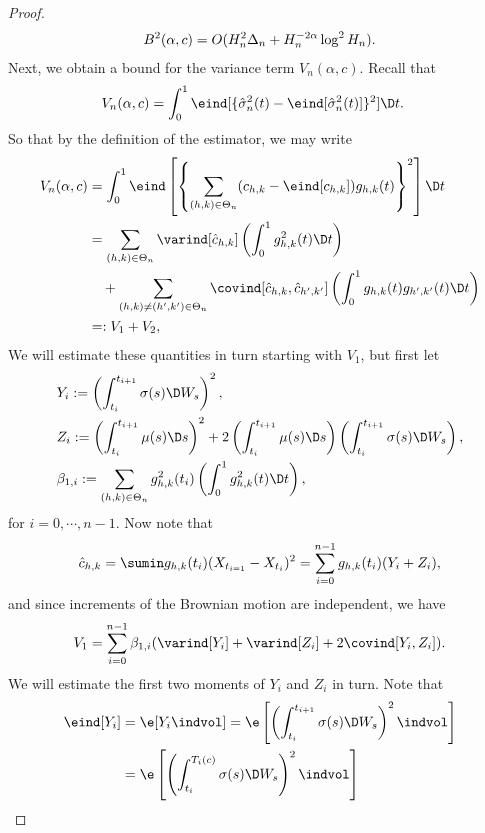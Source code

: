 \begin{appendices}
\begin{proof}
\begin{align}
  B^2(\alpha,c) =  O(H_n^2 \Delta_n  + H_n^{-2\alpha}\log^2 H_n).\notag
  \label{}
\end{align}
Next, we obtain a  bound for the variance term $V_n(\alpha, c)$. Recall that
\begin{align}
V_n(\alpha,c)  & =  \int_0^1 \eind[\{\svn(t) - \eind[\svn(t)]\}^2]  \D t.
\notag
\end{align}
So that by the definition of the estimator, we may write
\begin{align}
 V_n(\alpha,c) & =   \int_0^1\eind\left[\left\{\sumt (\chk -\eind[\chk])\ghk(t)\right\}^2 \right]\D t \notag\\
& =\sum_{(h,k) \in \Theta_n}\varind[\cnhk]\left( \int_0^1 g_{h,k}^2(t) \D t\right)\notag \\
& \quad + \sum_{(h,k) \ne (h',k') \in \Theta_n} \covind[\cnhk, \hat{c}_{h',k'}]\left( \int_0^1 g_{h,k}(t) g_{h',k'}(t)\D t\right) \notag\\
& =: V_1 + V_2,
\end{align}
 We will estimate these quantities in turn starting with $V_1$, but first let  
\begin{align}
  &Y_i := \left(\int^{t_{i+1}}_{t_i} \sigma(s) \D W_s\right)^2 ,\notag\\
  &Z_i := \left(\int^{t_{i+1}}_{t_i} \mu(s) \D s\right)^2 + 2\left(\int^{t_{i+1}}_{t_i} \mu(s) \D s\right)\left(\int^{t_{i+1}}_{t_i} \sigma(s) \D W_s\right), \notag\\ 
  &\beta_{1,i} := \sum_{(h,k) \in \Theta_n} g^2_{h,k}(t_i)\left( \int_0^1 g_{h,k}^2(t) \D t\right),\notag
  \label{}
\end{align}
for $i = 0,\cdots, n-1$. Now note that 
\begin{align}
  \cnhk = \sumin \ghk(t_i) (X_{t_{i=1}} - X_{t_i})^2 = \sum_{i = 0}^{n-1} g_{h,k}(t_i) (Y_i + Z_i),\notag
  \label{}
\end{align}
and  since  increments of the Brownian motion are independent, we have
\begin{align}
  V_{1} = \sum_{i = 0}^{n-1} \beta_{1,i} (\varind[Y_i] + \varind[Z_i] + 2 \covind[Y_i,Z_i]). \notag
  \label{}
\end{align}
We will estimate the first two moments of $Y_i$ and $Z_i$ in turn. Note that  
\begin{align}
  \eind[Y_i] &= \e[Y_i \indvol] = \e\left[ \left(\int^{t_{i+1}}_{t_i} \sigma(s) \D W_s\right)^2\indvol\right]\notag\\
&=\e\left[ \left(\int^{T_i(c)}_{t_i} \sigma(s) \D W_s\right)^2\indvol\right] \notag\\

\end{align}
\end{proof}
\end{appendices}
